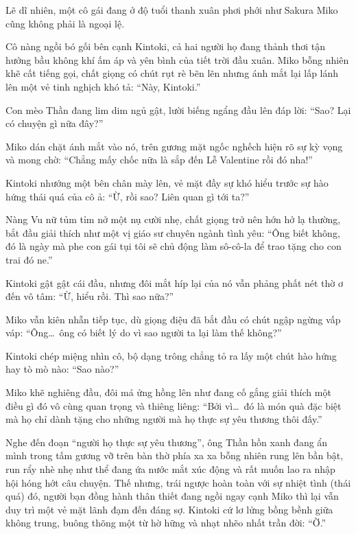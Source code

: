 \documentclass[../main.tex]{subfiles}
\begin{document}
Lẽ dĩ nhiên, một cô gái đang ở độ tuổi thanh xuân phơi phới như Sakura Miko cũng không phải là ngoại lệ.

Cô nàng ngồi bó gối bên cạnh Kintoki, cả hai người họ đang thảnh thơi tận hưởng bầu không khí ấm áp và yên bình của tiết trời đầu xuân. Miko bỗng nhiên khẽ cất tiếng gọi, chất giọng có chút rụt rè bẽn lẽn nhưng ánh mắt lại lấp lánh lên một vẻ tinh nghịch khó tả: ``Này, Kintoki.''

Con mèo Thần đang lim dim ngủ gật, lười biếng ngẩng đầu lên đáp lời: ``Sao? Lại có chuyện gì nữa đây?''

Miko dán chặt ánh mắt vào nó, trên gương mặt ngốc nghếch hiện rõ sự kỳ vọng và mong chờ: ``Chẳng mấy chốc nữa là sắp đến Lễ Valentine rồi đó nha!''


Kintoki nhướng một bên chân mày lên, vẻ mặt đầy sự khó hiểu trước sự hào hứng thái quá của cô ả: ``Ừ, rồi sao? Liên quan gì tới ta?''

Nàng Vu nữ tủm tỉm nở một nụ cười nhẹ, chất giọng trở nên hớn hở lạ thường, bắt đầu giải thích như một vị giáo sư chuyên ngành tình yêu: ``Ông biết không, đó là ngày mà phe con gái tụi tôi sẽ chủ động làm sô-cô-la để trao tặng cho con trai đó ne.''

Kintoki gật gật cái đầu, nhưng đôi mắt híp lại của nó vẫn phảng phất nét thờ ơ đến vô tâm: ``Ừ, hiểu rồi. Thì sao nữa?''

Miko vẫn kiên nhẫn tiếp tục, dù giọng điệu đã bắt đầu có chút ngập ngừng vấp váp: ``Ông\dots\ ông có biết lý do vì sao người ta lại làm thế không?''

Kintoki chép miệng nhìn cô, bộ dạng trông chẳng tỏ ra lấy một chút hào hứng hay tò mò nào: ``Sao nào?''

Miko khẽ nghiêng đầu, đôi má ửng hồng lên như đang cố gắng giải thích một điều gì đó vô cùng quan trọng và thiêng liêng: ``Bởi vì\dots\ đó là món quà đặc biệt mà họ chỉ dành tặng cho những người mà họ thực sự yêu thương thôi đấy.''

Nghe đến đoạn ``người họ thực sự yêu thương'', ông Thần hồn xanh đang ẩn mình trong tấm gương vỡ trên bàn thờ phía xa xa bỗng nhiên rung lên bần bật, run rẩy nhè nhẹ như thể đang ứa nước mắt xúc động và rất muốn lao ra nhập hội hóng hớt câu chuyện. Thế nhưng, trái ngược hoàn toàn với sự nhiệt tình (thái quá) đó, người bạn đồng hành thân thiết đang ngồi ngay cạnh Miko thì lại vẫn duy trì một vẻ mặt lãnh đạm đến đáng sợ. Kintoki cứ lơ lửng bồng bềnh giữa không trung, buông thõng một từ hờ hững và nhạt nhẽo nhất trần đời: ``Ờ.''
\end{document}
